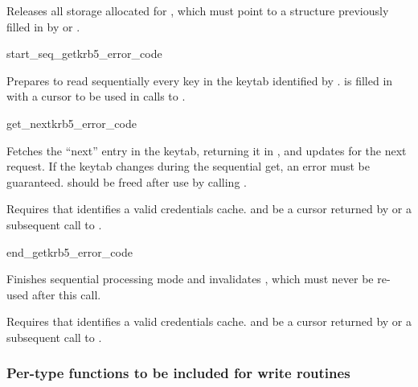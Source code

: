 Releases all storage allocated for , which must point
to a structure previously filled in by  or
.

\begin{funcdecl}{start_seq_get}{krb5_error_code}{\funcin}
\funcout
{}
\end{funcdecl}

Prepares to read sequentially every key in the keytab identified by
.
 is filled in with a cursor to be used in calls to
.

\begin{funcdecl}{get_next}{krb5_error_code}{\funcin}
\funcout
{}
\funcinout
{}
\end{funcdecl}

Fetches the ``next'' entry in the keytab, returning it in
, and updates  for the next
request.  If the keytab changes during the sequential get, an error
must be 
guaranteed.   should be freed after use by
calling
.

Requires that  identifies a valid credentials cache.  and
 be a cursor returned by
 or a subsequent call to
.


\begin{funcdecl}{end_get}{krb5_error_code}{\funcin}
\end{funcdecl}

Finishes sequential processing mode and invalidates ,
which must never be re-used after this call.

Requires that  identifies a valid credentials cache.  and
 be a cursor returned by
 or a subsequent call to
.


\subsubsection{Per-type functions to be included for write routines}

